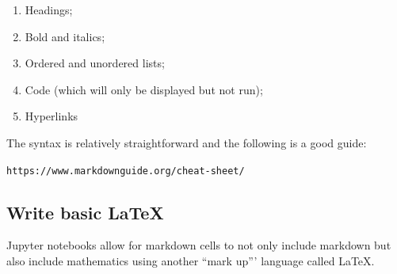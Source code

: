 \begin{enumerate}

\item 

Headings;

\item 

Bold and italics;

\item 

Ordered and unordered lists;

\item 

Code (which will only be displayed but not run);

\item 

Hyperlinks

\end{enumerate}


The syntax is relatively straightforward and the following is a good guide:


\texttt{https://www.markdownguide.org/cheat-sheet/}


\subsection{Write basic LaTeX}

Jupyter notebooks allow for markdown cells to not only include markdown but also
include mathematics using another ``mark up''' language called \LaTeX.


